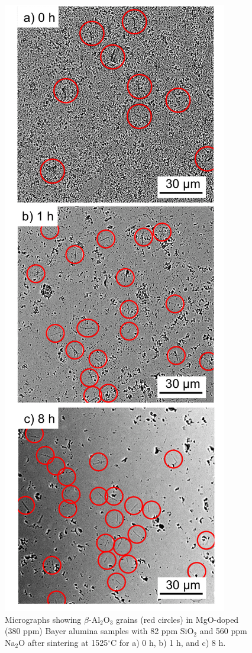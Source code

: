\newpage
\begin{figure}[H]
	\centering
	\includegraphics[scale=0.82]{Chapter-5/Figures/Figure8.png}
	\caption{Micrographs showing $\beta$-Al$_{2}$O$_{3}$ grains (red circles) in MgO-doped (380 ppm) Bayer alumina samples with 82 ppm SiO$_{2}$ and 560 ppm Na$_{2}$O after sintering at 1525$^{\circ}$C for a) 0 h, b) 1 h, and c) 8 h.}
	\label{Ch5-figure:Figure8}
\end{figure}

